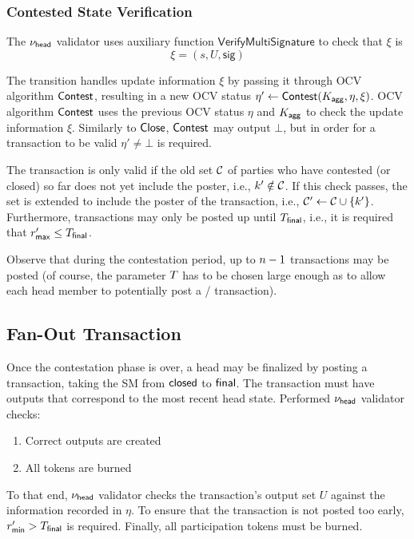 \subsubsection{Contested State Verification}

The $\nu_\mathsf{head}$ validator uses auxiliary function $\mathsf{VerifyMultiSignature}$ to check that $\xi$ is 
$$
\xi = (s,U, \mathsf{sig})
$$

The transition handles update
information $\xi$ by passing it through OCV algorithm $\mathsf{Contest}$,
resulting in a new OCV status
$\eta' \gets \mathsf{Contest} (K_{\mathsf{agg}},\eta,\xi)$.  OCV algorithm
$\mathsf{Contest}$ uses the previous OCV status $\eta$ and $K_{\mathsf{agg}}$ to check
the update information $\xi$.  Similarly to $\mathsf{Close}$, $\mathsf{Contest}$
may output $\bot$, but in order for a \mtxContest{} transaction to be
valid $\eta' \neq \bot$ is required.

The \mtxContest{} transaction is only valid if the old set
$\mathcal C$ of parties who have contested (or closed) so far does not yet
include the poster, i.e., $k' \notin \mathcal C$.  If this check
passes, the set is extended to include the poster of the \mtxContest{}
transaction, i.e., $\mathcal C' \gets \mathcal C \cup \{k'\}$.
Furthermore, \mtxContest{} transactions may only be posted up until
$T_{\mathsf{final}}$, i.e., it is required that $r_{\mathsf{max}}' \leq T_{\mathsf{final}}$.

Observe that during the contestation period, up to $n-1$
\mtxContest{} transactions may be posted (of course, the parameter
$T$ has to be chosen large enough as to allow each head member to
potentially post a \mtxClose{}/\mtxContest{} transaction).






\subsection{Fan-Out Transaction}  

Once the contestation phase is over, a head
may be finalized by posting a \mtxFanout{} transaction, taking the SM
from $\mathsf{closed}$ to $\mathsf{final}$.  The \mtxFanout{} transaction must
have outputs that correspond to the most recent head state. 
\newline
\newline 
Performed $\nu_\mathsf{head}$ validator checks:
\begin{enumerate}
  \item Correct outputs are created
  \item All tokens are burned
\end{enumerate}
\newline
To that
end, $\nu_\mathsf{head}$ validator checks the transaction's output set $U$
against the information recorded in $\eta$. To ensure that the \mtxFanout{} transaction is not posted too early,
$r_{\mathsf{min}}' > T_{\mathsf{final}}$ is required.  Finally, all participation tokens
must be burned.


